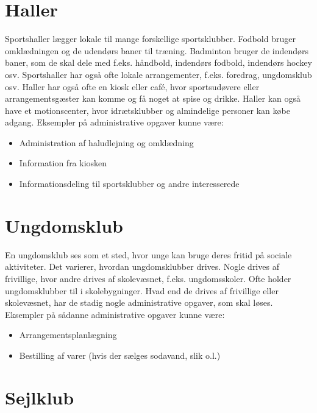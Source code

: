 \section{Haller}

Sportshaller lægger lokale til mange forskellige sportsklubber.
Fodbold bruger omklædningen og de udendørs baner til træning. 
Badminton bruger de indendørs baner, som de skal dele med f.eks. håndbold, indendørs fodbold, indendørs hockey osv.
Sportshaller har også ofte lokale arrangementer, f.eks. foredrag, ungdomsklub osv.
Haller har også ofte en kiosk eller café, hvor sportsudøvere eller arrangementsgæster kan komme og få noget at spise og drikke. 
Haller kan også have et motionscenter, hvor idrætsklubber og almindelige personer kan købe adgang\citep{spt_hal}. 
Eksempler på administrative opgaver kunne være:

\begin{itemize}
  \item Administration af haludlejning og omklædning 
  \item Information fra kiosken
  \item Informationsdeling til sportsklubber og andre interesserede
\end{itemize}


\section{Ungdomsklub}

En ungdomsklub ses som et sted, hvor unge kan bruge deres fritid på sociale aktiviteter.
Det varierer, hvordan ungdomsklubber drives. 
Nogle drives af frivillige, hvor andre drives af skolevæsnet, f.eks. ungdomsskoler\citep{ung1}.
Ofte holder ungdomsklubber til i skolebygninger. 
Hvad end de drives af frivillige eller skolevæsnet, har de stadig nogle administrative opgaver, som skal løses. 
Eksempler på sådanne administrative opgaver kunne være:

\begin{itemize}
  \item Arrangementsplanlægning
  \item Bestilling af varer (hvis der sælges sodavand, slik o.l.)
\end{itemize}

\section{Sejlklub}

